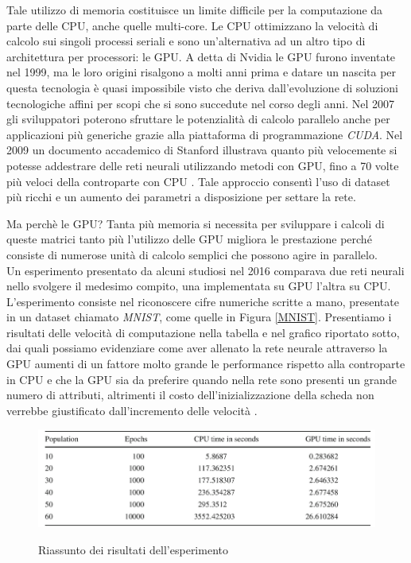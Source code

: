 Tale utilizzo di memoria costituisce un limite difficile per la computazione da parte delle CPU, anche quelle multi-core. Le CPU ottimizzano la velocità di calcolo sui singoli processi seriali e sono un'alternativa ad un altro tipo di architettura per processori: le GPU. A detta di Nvidia le GPU furono inventate nel 1999, ma le loro origini risalgono a molti anni prima e datare un nascita per questa tecnologia è quasi impossibile visto che deriva dall'evoluzione di soluzioni tecnologiche affini per scopi che si sono succedute nel corso degli anni. Nel 2007 gli sviluppatori poterono sfruttare le potenzialità di calcolo parallelo anche per applicazioni più generiche grazie alla piattaforma di programmazione \textit{CUDA}. Nel 2009 un documento accademico di Stanford illustrava quanto più velocemente si potesse addestrare delle reti neurali utilizzando metodi con GPU, fino a 70 volte più veloci della controparte con CPU \cite{raina2009large}. Tale approccio consentì l'uso di dataset più ricchi e un aumento dei parametri a disposizione per settare la rete. 

Ma perchè le GPU? Tanta più memoria si necessita per sviluppare i calcoli di queste matrici tanto più l'utilizzo delle GPU migliora le prestazione perché consiste di numerose unità di calcolo semplici che possono agire in parallelo.
\\
Un esperimento presentato da alcuni studiosi nel 2016 comparava due reti neurali nello svolgere il medesimo compito, una implementata su GPU l'altra su CPU. L'esperimento consiste nel riconoscere cifre numeriche scritte a mano, presentate in un dataset chiamato \textit{MNIST}, come quelle in Figura \ref{MNIST}. Presentiamo i risultati delle velocità di computazione nella tabella e nel grafico riportato sotto, dai quali possiamo evidenziare come aver allenato la rete neurale attraverso la GPU aumenti di un fattore molto grande le performance rispetto alla controparte in CPU e che la GPU sia da preferire quando nella rete sono presenti un grande numero di attributi, altrimenti il costo dell'inizializzazione della scheda non verrebbe giustificato dall'incremento delle velocità \cite{brito2016gpu}.

\vspace{15mm}

\begin{figure}[h]
\centering
{\includegraphics[scale=0.65]{media_tesi/table_experiment.png}}
\caption{Riassunto dei risultati dell'esperimento \cite{brito2016gpu}}
\label{fig:subfig}
\end{figure}

